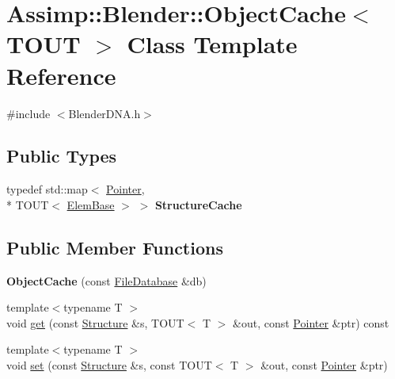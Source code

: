 \hypertarget{singleton_assimp_1_1_blender_1_1_object_cache}{\section{Assimp\+:\+:Blender\+:\+:Object\+Cache$<$ T\+O\+U\+T $>$ Class Template Reference}
\label{singleton_assimp_1_1_blender_1_1_object_cache}
}


{\ttfamily \#include $<$Blender\+D\+N\+A.\+h$>$}

\subsection*{Public Types}
\begin{DoxyCompactItemize}
\item 
\hypertarget{singleton_assimp_1_1_blender_1_1_object_cache_a22b7f026474f2ed272ca8fbe339297a5}{typedef std\+::map$<$ \hyperlink{struct_assimp_1_1_blender_1_1_pointer}{Pointer}, \\*
T\+O\+U\+T$<$ \hyperlink{struct_assimp_1_1_blender_1_1_elem_base}{Elem\+Base} $>$ $>$ {\bfseries Structure\+Cache}}\label{singleton_assimp_1_1_blender_1_1_object_cache_a22b7f026474f2ed272ca8fbe339297a5}

\end{DoxyCompactItemize}
\subsection*{Public Member Functions}
\begin{DoxyCompactItemize}
\item 
\hypertarget{singleton_assimp_1_1_blender_1_1_object_cache_a6e234da94c48e3c1af37462c38afeff1}{{\bfseries Object\+Cache} (const \hyperlink{class_assimp_1_1_blender_1_1_file_database}{File\+Database} \&db)}\label{singleton_assimp_1_1_blender_1_1_object_cache_a6e234da94c48e3c1af37462c38afeff1}

\item 
{\footnotesize template$<$typename T $>$ }\\void \hyperlink{singleton_assimp_1_1_blender_1_1_object_cache_a9d65bc7d602f359162de0e7e3b9648e0}{get} (const \hyperlink{class_assimp_1_1_blender_1_1_structure}{Structure} \&s, T\+O\+U\+T$<$ T $>$ \&out, const \hyperlink{struct_assimp_1_1_blender_1_1_pointer}{Pointer} \&ptr) const 
\item 
{\footnotesize template$<$typename T $>$ }\\void \hyperlink{singleton_assimp_1_1_blender_1_1_object_cache_a4cb36573c57c9a8901558be1720714db}{set} (const \hyperlink{class_assimp_1_1_blender_1_1_structure}{Structure} \&s, const T\+O\+U\+T$<$ T $>$ \&out, const \hyperlink{struct_assimp_1_1_blender_1_1_pointer}{Pointer} \&ptr)
\end{DoxyCompactItemize}



